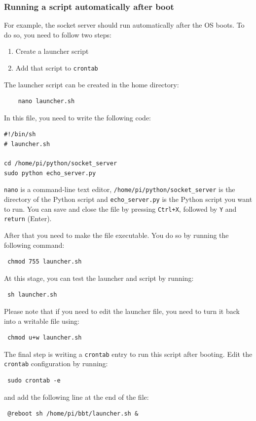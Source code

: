 \documentclass[twoside,a4paper]{refart}
\begin{document}
\subsubsection{Running a script automatically after boot}
For example, the socket server should run automatically after the OS boots. To do so, you need to follow two steps:
\begin{enumerate}
	\item
	Create a launcher script
	\item
	Add that script to {\tt crontab}
\end{enumerate}
The launcher script can be created in the home directory:
\begin{verbatim}
	nano launcher.sh
\end{verbatim}
In this file, you need to write the following code:
\begin{verbatim}
#!/bin/sh
# launcher.sh

cd /home/pi/python/socket_server
sudo python echo_server.py
\end{verbatim}
{\tt nano} is a command-line text editor, {\tt /home/pi/python/socket\_server} is the directory of the Python script and {\tt echo\_server.py} is the Python script you want to run. You can save and close the file by pressing {\tt Ctrl+X}, followed by {\tt Y} and {\tt return} (Enter). 

After that you need to make the file executable. You do so by running the following command:
\begin{verbatim} chmod 755 launcher.sh \end{verbatim}
At this stage, you can test the launcher and script by running:
\begin{verbatim} sh launcher.sh \end{verbatim}
Please note that if you need to edit the launcher file, you need to turn it back into a writable file using:
\begin{verbatim} chmod u+w launcher.sh \end{verbatim} 

The final step is writing a {\tt crontab} entry to run this script after booting. Edit the {\tt crontab} configuration by running:
\begin{verbatim} sudo crontab -e \end{verbatim}
and add the following line at the end of the file:
\begin{verbatim} @reboot sh /home/pi/bbt/launcher.sh & \end{verbatim}
\end{document}
